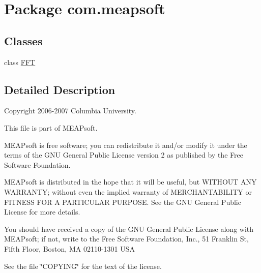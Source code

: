 \hypertarget{namespacecom_1_1meapsoft}{\section{Package com.\-meapsoft}
\label{namespacecom_1_1meapsoft}
}
\subsection*{Classes}
\begin{DoxyCompactItemize}
\item 
class \hyperlink{classcom_1_1meapsoft_1_1_f_f_t}{F\-F\-T}
\end{DoxyCompactItemize}


\subsection{Detailed Description}
Copyright 2006-\/2007 Columbia University.

This file is part of M\-E\-A\-Psoft.

M\-E\-A\-Psoft is free software; you can redistribute it and/or modify it under the terms of the G\-N\-U General Public License version 2 as published by the Free Software Foundation.

M\-E\-A\-Psoft is distributed in the hope that it will be useful, but W\-I\-T\-H\-O\-U\-T A\-N\-Y W\-A\-R\-R\-A\-N\-T\-Y; without even the implied warranty of M\-E\-R\-C\-H\-A\-N\-T\-A\-B\-I\-L\-I\-T\-Y or F\-I\-T\-N\-E\-S\-S F\-O\-R A P\-A\-R\-T\-I\-C\-U\-L\-A\-R P\-U\-R\-P\-O\-S\-E. See the G\-N\-U General Public License for more details.

You should have received a copy of the G\-N\-U General Public License along with M\-E\-A\-Psoft; if not, write to the Free Software Foundation, Inc., 51 Franklin St, Fifth Floor, Boston, M\-A 02110-\/1301 U\-S\-A

See the file \char`\"{}\-C\-O\-P\-Y\-I\-N\-G\char`\"{} for the text of the license. 